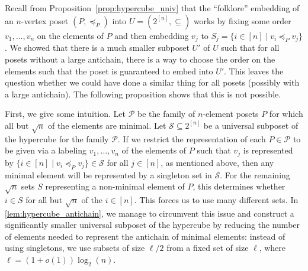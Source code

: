 \documentclass[11pt]{article}
\newcommand{\1}{\mathbbm{1}}
\def\cleq{\preccurlyeq}
\begin{document}
Recall from Proposition~\ref{prop:hypercube_univ} that the ``folklore'' embedding of an $n$-vertex poset $(P,\cleq_P)$ into $U=(2^{[n]},\subseteq )$ works by fixing some order $v_1,\dots,v_n$ on the elements of $P$ and then embedding $v_j$ to $S_j=\{i\in [n]\mid v_i\cleq_P v_j\}$. We showed that there is a much smaller subposet $U'$ of $U$ such that for all posets without a large antichain, there is a way to choose the order on the elements such that the poset is guaranteed to embed into $U'$. This leaves the question whether we could have done a similar thing for all posets (possibly with a large antichain). The following proposition shows that this is not possible.

First, we give some intuition. Let $\mathcal{P}$ be the family of $n$-element posets $P$ for which all but $\sqrt{n}$ of the elements are minimal. Let $\mathcal{S} \subseteq 2^{[n]}$ be a universal subposet of the hypercube for the family $\mathcal{P}$. If we restrict the representation of each $P \in \mathcal{P}$ to be given via a labeling $v_1,\ldots,v_n$ of the elements of $P$ such that $v_j$ is represented by $\{i \in [n]\mid v_i \cleq_P v_j\} \in \mathcal{S}$ for all $j \in [n]$, as mentioned above, then any minimal element will be represented by a singleton set in $\mathcal{S}$. For the remaining $\sqrt{n}$ sets $S$ representing a non-minimal element of $P$, this determines whether $i\in S$ for all but $\sqrt{n}$ of the $i\in [n]$. This forces us to use many different sets.
In \cref{lem:hypercube_antichain}, we manage to circumvent this issue and construct a significantly smaller universal subposet of the hypercube by reducing the number of elements needed to represent the antichain of minimal elements: instead of using singletons, we use subsets of size $\ell/2$ from a fixed set of size $\ell$, where $\ell = (1 + o(1))\log_2(n)$.
\end{document}
